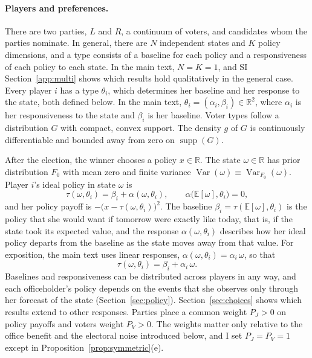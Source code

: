 \documentclass[12pt,letterpaper]{article}
\begin{document}
\paragraph{Players and preferences.}
There are two parties, $L$ and $R$, a continuum of voters, and candidates whom the parties nominate. In general, there are $N$ independent states and $K$ policy dimensions, and a type consists of a baseline for each policy and a responsiveness of each policy to each state. In the main text, $N=K=1$, and SI Section~\ref{app:multi} shows which results hold qualitatively in the general case. Every player $i$ has a type $\theta_i$, which determines her baseline and her response to the state, both defined below. In the main text, $\theta_i=(\alpha_i,\beta_i)\in\mathbb{R}^2$, where $\alpha_i$ is her responsiveness to the state and $\beta_i$ is her baseline. Voter types follow a distribution $G$ with compact, convex support. The density $g$ of $G$ is continuously differentiable and bounded away from zero on $\operatorname{supp}(G)$.

After the election, the winner chooses a policy $x\in\mathbb{R}$. The state $\omega\in\mathbb{R}$ has prior distribution $F_0$ with mean zero and finite variance $\operatorname{Var}(\omega)\equiv\operatorname{Var}_{F_0}(\omega)$. Player $i$'s ideal policy in state $\omega$ is
\[
\tau(\omega,\theta_i)=\beta_i+\alpha(\omega,\theta_i),\qquad \alpha\big(\mathbb{E}[\omega],\theta_i\big)=0,
\]
and her policy payoff is $-\big(x-\tau(\omega,\theta_i)\big)^2$. The baseline $\beta_i=\tau(\mathbb{E}[\omega],\theta_i)$ is the policy that she would want if tomorrow were exactly like today, that is, if the state took its expected value, and the response $\alpha(\omega,\theta_i)$ describes how her ideal policy departs from the baseline as the state moves away from that value. For exposition, the main text uses linear responses, $\alpha(\omega,\theta_i)=\alpha_i\,\omega$, so that
\[
\tau(\omega,\theta_i)=\beta_i+\alpha_i\,\omega .
\]
Baselines and responsiveness can be distributed across players in any way, and each officeholder's policy depends on the events that she observes only through her forecast of the state (Section~\ref{sec:policy}). Section~\ref{sec:choices} shows which results extend to other responses. Parties place a common weight $P_J>0$ on policy payoffs and voters weight $P_V>0$. The weights matter only relative to the office benefit and the electoral noise introduced below, and I set $P_J=P_V=1$ except in Proposition~\ref{prop:symmetric}(e).
\end{document}
